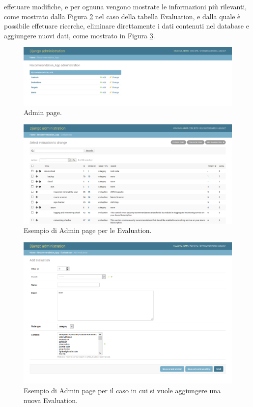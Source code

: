 effetuare modifiche, e per ognuna vengono mostrate le informazioni più rilevanti, come mostrato dalla 
Figura \ref{fig:MCRS_adminpage_evaluationEX} nel caso della tabella Evaluation, e dalla quale è possibile 
effetuare ricerche, eliminare direttamente i dati contenuti nel database e aggiungere 
nuovi dati, come mostrato in Figura \ref{fig:MCRS_adminpage_evaluationEX_add}.
%
\begin{figure}
    \includegraphics[scale=0.3]{images/MCRS_adminpage.png}
    \caption{Admin page.}
    \label{fig:MCRS_adminpage}
\end{figure}
%
\begin{figure}
    \includegraphics[scale=0.3]{images/MCRS_adminpage_evaluationEX.png}
    \caption{Esempio di Admin page per le Evaluation.}
    \label{fig:MCRS_adminpage_evaluationEX}
\end{figure}
%
\begin{figure}
    \includegraphics[scale=0.55]{images/MCRS_adminpage_evaluationEX_add.png}
    \caption{Esempio di Admin page per il caso in cui si vuole aggiungere una nuova Evaluation.}
    \label{fig:MCRS_adminpage_evaluationEX_add}
\end{figure}


